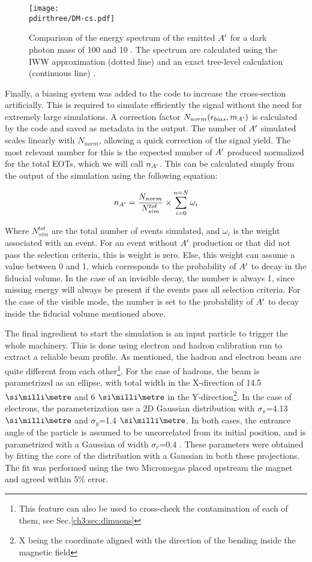 \begin{figure}[htb!]
  \centering
  \texttt{[image: \\pdirthree/DM-cs.pdf]}
  \caption[IWW vs tree-level energy spectra]{Comparison of the energy spectrum of the emitted $A'$ for a dark photon mass of 100 \mev and 10 \mev. The spectrum are calculated using the IWW approximation (dotted line) and an exact tree-level calculation (continuous line) \cite{DMsimulation}.}
  \label{fig:dm-iww-tl}
\end{figure}


Finally, a biasing system was added to the code to increase the cross-section artificially. This is required to simulate efficiently the signal without the need for extremely large simulations. A correction factor $N_{norm}(\epsilon_{bias},m_{A'})$ is calculated by the code and saved as metadata in the output. The number of $A'$ simulated scales linearly with $N_{norm}$, allowing a quick correction of the signal yield. The most relevant number for this is the expected number of $A'$ produced normalized for the total EOTs, which we will call $n_{A'}$. This can be calculated simply from the output of the simulation using the following equation:

\begin{equation}
  \label{eq:1}
  n_{A'} = \frac{N_{norm}}{N^{tot}_{sim}} \times \sum^{n=N}_{i=0} \omega_i
\end{equation}

Where $N^{tot}_{sim}$ are the total number of events simulated, and $\omega_i$ is the weight associated with an event. For an event without $A'$ production or that did not pass the selection criteria, this is weight is zero. Else, this weight can assume a value between 0 and 1, which corresponds to the probability of $A'$ to decay in the fiducial volume. In the case of an invisible decay, the number is always 1, since missing energy will always be present if the events pass all selection criteria. For the case of the visible mode, the number is set to the probability of $A'$ to decay inside the fiducial volume mentioned above.

The final ingredient to start the simulation is an input particle to trigger the whole machinery. This is done using electron and hadron calibration run to extract a reliable beam profile. As mentioned, the hadron and electron beam are quite different from each other\footnote{This feature can also be used to cross-check the contamination of each of them, see Sec.\ref{ch3:sec:dimuons}}. For the case of hadrons, the beam is parametrized as an ellipse, with total width in the X-direction of 14.5 $\mmi$ and 6 $\mmi$ in the Y-direction\footnote{X being the coordinate aligned with the direction of the bending inside the magnetic field}. In the case of electrons, the parameterization use a 2D Gaussian distribution with $\sigma_x$=4.13 $\mmi$ and $\sigma_y$=1.4 $\mmi$. In both cases, the entrance angle of the particle is assumed to be uncorrelated from its initial position, and is parametrized with a Gaussian of width $\sigma_r$=0.4 \mrad. These parameters were obtained by fitting the core of the distribution with a Gaussian in both these projections. The fit was performed using the two Micromegas placed upstream the magnet and agreed within 5\% error.

